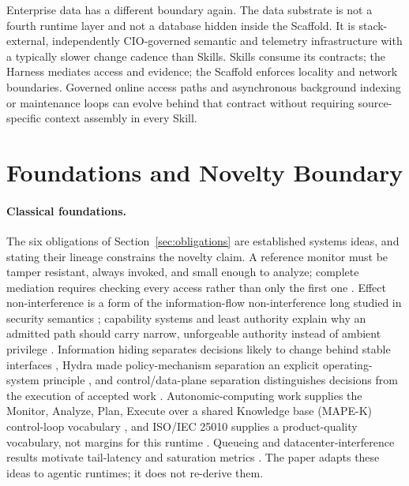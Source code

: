 Enterprise data has a different boundary again. The data substrate is not a fourth runtime layer and not a database hidden inside the Scaffold. It is stack-external, independently CIO-governed semantic and telemetry infrastructure with a typically slower change cadence than Skills. Skills consume its contracts; the Harness mediates access and evidence; the Scaffold enforces locality and network boundaries. Governed online access paths and asynchronous background indexing or maintenance loops can evolve behind that contract without requiring source-specific context assembly in every Skill.

\section{Foundations and Novelty Boundary}
\label{sec:related}

\paragraph{Classical foundations.}
The six obligations of Section~\ref{sec:obligations} are established systems ideas, and stating their lineage constrains the novelty claim. A reference monitor must be tamper resistant, always invoked, and small enough to analyze; complete mediation requires checking every access rather than only the first one \cite{anderson1972reference,saltzer1975protection}. Effect non-interference is a form of the information-flow non-interference long studied in security semantics \cite{goguen1982noninterference}; capability systems and least authority explain why an admitted path should carry narrow, unforgeable authority instead of ambient privilege \cite{miller2003capability}. Information hiding separates decisions likely to change behind stable interfaces \cite{parnas1972criteria}, Hydra made policy-mechanism separation an explicit operating-system principle \cite{levin1975hydra}, and control/data-plane separation distinguishes decisions from the execution of accepted work \cite{kreutz2015sdn}. Autonomic-computing work supplies the Monitor, Analyze, Plan, Execute over a shared Knowledge base (MAPE-K) control-loop vocabulary \cite{kephart2003autonomic,ibm2006autonomic}, and ISO/IEC 25010 supplies a product-quality vocabulary, not margins for this runtime \cite{iso25010}. Queueing and datacenter-interference results motivate tail-latency and saturation metrics \cite{kleinrock1975queueing,mars2011bubbleup,dean2013tail}. The paper adapts these ideas to agentic runtimes; it does not re-derive them.

